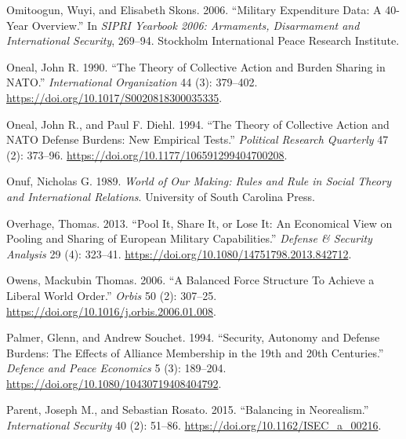 \documentclass[
  12,
  letterpaper,
  DIV=11,
  numbers=noendperiod]{scrartcl}
\newlength{\cslhangindent}
\newlength{\cslentryspacingunit} %
\newenvironment{CSLReferences}[2] %
 {%
  \setlength{\parindent}{0pt}
  \ifodd #1
  \let\oldpar\par
  \def\par{\hangindent=\cslhangindent\oldpar}
  \fi
  \setlength{\parskip}{#2\cslentryspacingunit}
 }%
 {}
\begin{document}
\begin{CSLReferences}{1}{0}
\leavevmode{}%
Omitoogun, Wuyi, and Elisabeth Skons. 2006. {``Military Expenditure
Data: A 40-Year Overview.''} In \emph{{SIPRI Yearbook} 2006:
{Armaments}, {Disarmament} and {International Security}}, 269--94.
{Stockholm International Peace Research Institute}.

\leavevmode{}%
Oneal, John R. 1990. {``The Theory of Collective Action and Burden
Sharing in {NATO}.''} \emph{International Organization} 44 (3):
379--402. \url{https://doi.org/10.1017/S0020818300035335}.

\leavevmode{}%
Oneal, John R., and Paul F. Diehl. 1994. {``The {Theory} of {Collective
Action} and {NATO Defense Burdens}: {New Empirical Tests}.''}
\emph{Political Research Quarterly} 47 (2): 373--96.
\url{https://doi.org/10.1177/106591299404700208}.

\leavevmode{}%
Onuf, Nicholas G. 1989. \emph{World of Our Making: Rules and Rule in
Social Theory and International Relations}. {University of South
Carolina Press}.

\leavevmode{}%
Overhage, Thomas. 2013. {``Pool It, Share It, or Lose It: An Economical
View on Pooling and Sharing of {European} Military Capabilities.''}
\emph{Defense \& Security Analysis} 29 (4): 323--41.
\url{https://doi.org/10.1080/14751798.2013.842712}.

\leavevmode{}%
Owens, Mackubin Thomas. 2006. {``A {Balanced Force Structure To Achieve}
a {Liberal World Order}.''} \emph{Orbis} 50 (2): 307--25.
\url{https://doi.org/10.1016/j.orbis.2006.01.008}.

\leavevmode{}%
Palmer, Glenn, and Andrew Souchet. 1994. {``Security, Autonomy and
Defense Burdens: {The} Effects of Alliance Membership in the 19th and
20th Centuries.''} \emph{Defence and Peace Economics} 5 (3): 189--204.
\url{https://doi.org/10.1080/10430719408404792}.

\leavevmode{}%
Parent, Joseph M., and Sebastian Rosato. 2015. {``Balancing in
{Neorealism}.''} \emph{International Security} 40 (2): 51--86.
\url{https://doi.org/10.1162/ISEC_a_00216}.


\end{CSLReferences}
\end{document}
